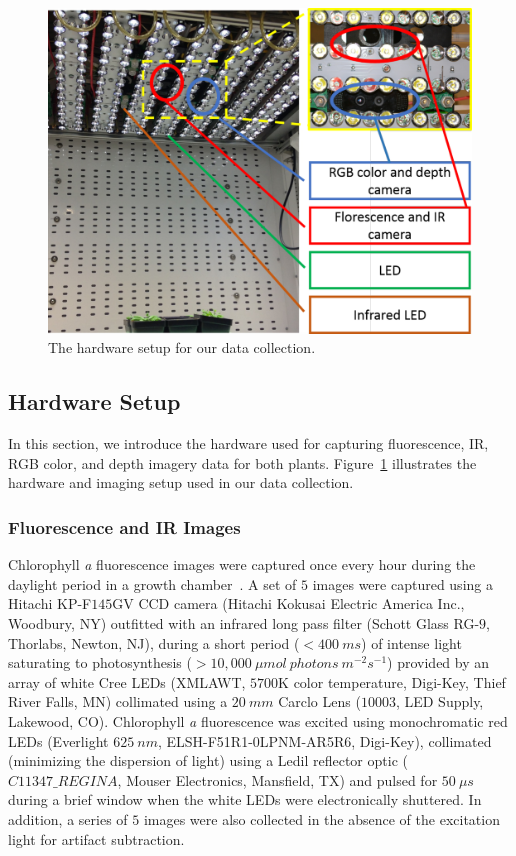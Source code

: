 \begin{figure}
  \includegraphics[width=0.95\linewidth]{Figures/hardware}
\caption{The hardware setup for our data collection.}
\label{fig:hardware}
\end{figure}

\subsection{Hardware Setup}
In this section, we introduce the hardware used for capturing fluorescence, IR, RGB color, and depth imagery data for both plants.
Figure~\ref{fig:hardware} illustrates the hardware and imaging setup used in our data collection.


\subsubsection{Fluorescence and IR Images}
Chlorophyll {\it a} fluorescence images were captured once every hour during the daylight period in a growth chamber~\cite{kramer2015plant}.
A set of $5$ images were captured using a Hitachi KP-F$145$GV CCD camera (Hitachi Kokusai Electric America Inc., Woodbury, NY) outfitted with an infrared long pass filter (Schott Glass RG-$9$, Thorlabs, Newton, NJ), during a short period ($<400~ms$) of intense light saturating to photosynthesis ($>10,000~\mu mol~photons~m^{-2} s^{-1}$) provided by an array of white Cree LEDs (XMLAWT, $5700$K color temperature, Digi-Key, Thief River Falls, MN) collimated using a $20~mm$ Carclo Lens ($10003$, LED Supply, Lakewood, CO).
Chlorophyll {\it a} fluorescence was excited using monochromatic red LEDs (Everlight $625~nm$, ELSH-F51R1-0LPNM-AR5R6, Digi-Key), collimated (minimizing the dispersion of light) using a Ledil reflector optic ($C11347\_REGINA$, Mouser Electronics, Mansfield, TX) and pulsed for $50~\mu s$ during a brief window when the white LEDs were electronically shuttered.
In addition, a series of $5$ images were also collected in the absence of the excitation light for artifact subtraction.

